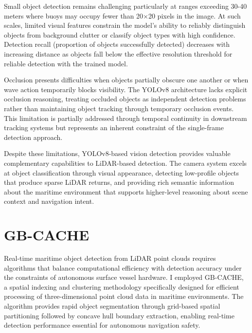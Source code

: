 \documentclass{erauthesis}
\begin{document}
Small object detection remains challenging particularly at ranges exceeding 30-40 meters where buoys may occupy fewer than 20×20 pixels in the image.
At such scales, limited visual features constrain the model's ability to reliably distinguish objects from background clutter or classify object types with high confidence.
Detection recall (proportion of objects successfully detected) decreases with increasing distance as objects fall below the effective resolution threshold for reliable detection with the trained model.

Occlusion presents difficulties when objects partially obscure one another or when wave action temporarily blocks visibility.
The YOLOv8 architecture lacks explicit occlusion reasoning, treating occluded objects as independent detection problems rather than maintaining object tracking through temporary occlusion events.
This limitation is partially addressed through temporal continuity in downstream tracking systems but represents an inherent constraint of the single-frame detection approach.

Despite these limitations, YOLOv8-based vision detection provides valuable complementary capabilities to \ac{LiDAR}-based detection.
The camera system excels at object classification through visual appearance, detecting low-profile objects that produce sparse \ac{LiDAR} returns, and providing rich semantic information about the maritime environment that supports higher-level reasoning about scene context and navigation intent.


\section{GB-CACHE} \label{gbcache}

Real-time maritime object detection from \ac{LiDAR} point clouds requires algorithms that balance computational efficiency with detection accuracy under the constraints of autonomous surface vessel hardware.
I employed \ac{GB-CACHE}, a spatial indexing and clustering methodology specifically designed for efficient processing of three-dimensional point cloud data in maritime environments.
The algorithm provides rapid object segmentation through grid-based spatial partitioning followed by concave hull boundary extraction, enabling real-time detection performance essential for autonomous navigation safety.
\end{document}
